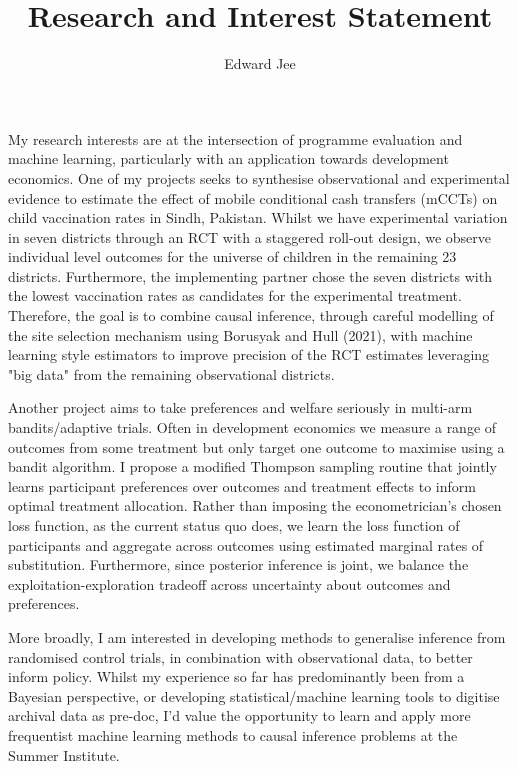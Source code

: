 \documentclass{article}
\author{Edward Jee}
\title{Research and Interest Statement}
\begin{document}
\maketitle

My research interests are at the intersection of programme evaluation and machine 
learning, particularly with an application towards development economics. One 
of my projects seeks to synthesise observational and experimental evidence to 
estimate the effect of mobile conditional cash transfers (mCCTs) on 
child vaccination rates in Sindh, Pakistan. Whilst we have experimental variation 
in seven districts through an RCT with a staggered roll-out design, we observe 
individual level outcomes for 
the universe of children in the remaining 23 districts. Furthermore, the implementing 
partner chose the seven districts with the lowest vaccination rates as candidates 
for the experimental treatment. Therefore, the goal is to combine causal inference, 
through careful modelling of the site selection mechanism using Borusyak and Hull (2021), 
with machine learning style estimators to improve precision of the RCT estimates 
leveraging "big data" from the remaining observational districts.



Another project aims to take preferences and welfare seriously in multi-arm 
bandits/adaptive trials. Often in development economics we measure a range of 
outcomes from some treatment but only target one outcome to maximise using a 
bandit algorithm. I propose a modified Thompson sampling routine that jointly 
learns participant preferences over outcomes and treatment effects to inform optimal treatment 
allocation. Rather than imposing the econometrician's chosen loss function, as 
the current status quo does, we learn the loss function of participants and 
aggregate across outcomes using estimated marginal rates of substitution. Furthermore, 
since posterior inference is joint, we balance the exploitation-exploration 
tradeoff across uncertainty about outcomes and preferences.


More broadly, I am interested in developing methods to generalise inference from 
randomised control trials, in combination with observational data, to better inform 
policy. Whilst my experience so far has predominantly been from a Bayesian perspective, 
or developing statistical/machine learning tools to digitise archival data as pre-doc,
I'd value the opportunity to learn and apply more frequentist machine learning methods 
to causal inference problems at the Summer Institute.



    
\end{document}
